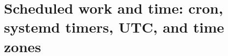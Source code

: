 \chapter{Scheduled work and time: cron, systemd timers, UTC, and time zones}
\label{ch:scheduled-work-and-time-cron-systemd}

